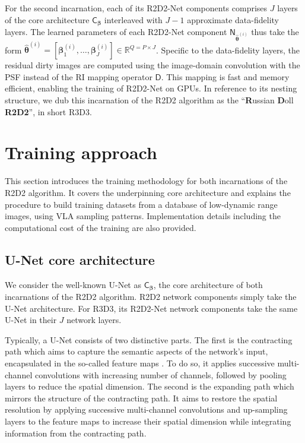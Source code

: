 \documentclass[preprint2,twocolumn]{aastex631}
\newcommand{\Nb}{\ensuremath{\boldsymbol{\mathsf{N}}}}
\newcommand{\Db}{\ensuremath{\boldsymbol{\mathsf{D}}}}
\newcommand{\Cb}{\ensuremath{\boldsymbol{\mathsf{C}}}}
\newcommand{\thetab}{\ensuremath{\boldsymbol{\theta}}}
\newcommand{\betab}{\ensuremath{\boldsymbol{\beta}}}
\newcommand{\eR}{\mathbb{R}}
\begin{document}
For the second incarnation, each of its R2D2-Net components comprises $J$ layers of the core architecture $\Cb_{\betab}$ interleaved with $J-1$ approximate data-fidelity layers. The learned parameters of each R2D2-Net component $\Nb_{\widehat{\thetab}^{(i)}}$ thus take the form $\widehat{\thetab}^{(i)} = [\betab_1^{(i)},\dots, \betab_J^{(i)}] \in \eR^{Q=P \times J}$. Specific to the data-fidelity layers, the residual dirty images are computed using the image-domain convolution with the PSF instead of the RI mapping operator $\Db$. This mapping is fast and memory efficient, enabling the training of R2D2-Net on GPUs. In reference to its nesting structure, we dub this incarnation of the R2D2 algorithm as the ``\textbf{R}ussian \textbf{D}oll \textbf{R2D2}'', in short R3D3.
\section{Training approach}\label{sec:Training-approach}
This section introduces the training methodology for both incarnations of the R2D2 algorithm. It covers the underpinning core architecture and explains the procedure to build training datasets from a database of low-dynamic range images, using VLA sampling patterns. Implementation details including the computational cost of the training are also provided.

\subsection{U-Net core architecture}\label{subsec:UNet-core-architecture}
We consider the well-known U-Net \citep{Ronneberger15} as $\Cb_{\betab}$, the core architecture of both incarnations of the R2D2 algorithm. R2D2 network components simply take the U-Net architecture. For R3D3, its R2D2-Net network components take the same U-Net in their $J$ network layers.

{Typically, a U-Net consists of two distinctive parts. The first is the contracting path which aims to capture the semantic aspects of the network's input, encapsulated in the so-called feature maps \citep{lecun2015deep}. To do so, it applies successive multi-channel convolutions with increasing number of channels, followed by pooling layers to reduce the spatial dimension. The second is the expanding path which mirrors the structure of the contracting path. It aims to restore the spatial resolution by applying successive multi-channel convolutions and up-sampling layers to the feature maps to increase their spatial dimension while integrating information from the contracting path.}
\end{document}

